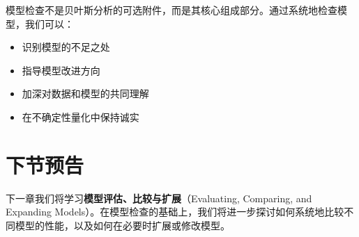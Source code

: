 模型检查不是贝叶斯分析的可选附件，而是其核心组成部分。通过系统地检查模型，我们可以：

\begin{itemize}
  \item 识别模型的不足之处
  \item 指导模型改进方向
  \item 加深对数据和模型的共同理解
  \item 在不确定性量化中保持诚实
\end{itemize}

\section{下节预告}

下一章我们将学习\textbf{模型评估、比较与扩展}（Evaluating, Comparing, and Expanding Models）。在模型检查的基础上，我们将进一步探讨如何系统地比较不同模型的性能，以及如何在必要时扩展或修改模型。

\endinput
